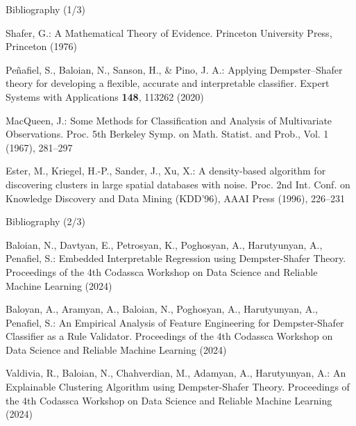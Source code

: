 \documentclass[aspectratio=169]{beamer}
\begin{document}
\begin{frame}{Bibliography (1/3)}
\begin{thebibliography}{8}
{\footnotesize
{}
Shafer, G.: A Mathematical Theory of Evidence. Princeton University Press, Princeton (1976)

Peñafiel, S., Baloian, N., Sanson, H., \& Pino, J. A.: Applying Dempster–Shafer theory for developing a flexible, accurate and interpretable classifier. Expert Systems with Applications \textbf{148}, 113262 (2020)

MacQueen, J.: Some Methods for Classification and Analysis of Multivariate Observations. Proc. 5th Berkeley Symp. on Math. Statist. and Prob., Vol. 1 (1967), 281--297

Ester, M., Kriegel, H.-P., Sander, J., Xu, X.: A density-based algorithm for discovering clusters in large spatial databases with noise. Proc. 2nd Int. Conf. on Knowledge Discovery and Data Mining (KDD'96), AAAI Press (1996), 226--231
}
\end{thebibliography}
\end{frame}

\begin{frame}{Bibliography (2/3)}
\begin{thebibliography}{8}
{\footnotesize
\setcounter{enumiv}{4}
Baloian, N., Davtyan, E., Petrosyan, K., Poghosyan, A., Harutyunyan, A., Penafiel, S.: Embedded Interpretable Regression using Dempster-Shafer Theory. Proceedings of the 4th Codassca Workshop on Data Science and Reliable Machine Learning (2024)

Baloyan, A., Aramyan, A., Baloian, N., Poghosyan, A., Harutyunyan, A., Penafiel, S.: An Empirical Analysis of Feature Engineering for Dempster-Shafer Classifier as a Rule Validator. Proceedings of the 4th Codassca Workshop on Data Science and Reliable Machine Learning (2024)

Valdivia, R., Baloian, N., Chahverdian, M., Adamyan, A., Harutyunyan, A.: An Explainable Clustering Algorithm using Dempster-Shafer Theory. Proceedings of the 4th Codassca Workshop on Data Science and Reliable Machine Learning (2024)
}
\end{thebibliography}
\end{frame}
\end{document}
